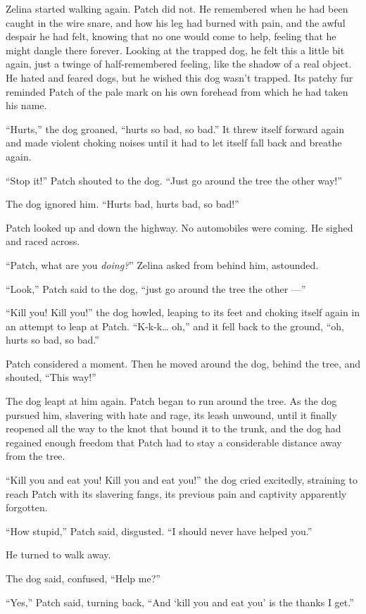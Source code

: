 \documentclass[ebook,oneside,openany,12pt]{memoir}
\begin{document}
Zelina started walking again. Patch did not. He remembered when he had
been caught in the wire snare, and how his leg had burned with pain,
and the awful despair he had felt, knowing that no one would come to
help, feeling that he might dangle there forever. Looking at the
trapped dog, he felt this a little bit again, just a twinge of
half-remembered feeling, like the shadow of a real object. He hated
and feared dogs, but he wished this dog wasn’t trapped. Its patchy fur
reminded Patch of the pale mark on his own forehead from which he had
taken his name.

“Hurts,” the dog groaned, “hurts so bad, so bad.” It threw itself
forward again and made violent choking noises until it had to let
itself fall back and breathe again.

“Stop it!” Patch shouted to the dog. “Just go around the tree the
other way!”

The dog ignored him. “Hurts bad, hurts bad, so bad!”

Patch looked up and down the highway. No automobiles were coming. He
sighed and raced across.

“Patch, what are you \emph{doing?}” Zelina asked from behind him,
astounded.

“Look,” Patch said to the dog, “just go around the tree the other —”

“Kill you! Kill you!” the dog howled, leaping to its feet and choking
itself again in an attempt to leap at Patch. “K-k-k… oh,” and it fell
back to the ground, “oh, hurts so bad, so bad.”

Patch considered a moment. Then he moved around the dog, behind the
tree, and shouted, “This way!”

The dog leapt at him again. Patch began to run around the tree. As the
dog pursued him, slavering with hate and rage, its leash unwound,
until it finally reopened all the way to the knot that bound it to the
trunk, and the dog had regained enough freedom that Patch had to stay
a considerable distance away from the tree.

“Kill you and eat you! Kill you and eat you!” the dog cried excitedly,
straining to reach Patch with its slavering fangs, its previous pain
and captivity apparently forgotten.

“How stupid,” Patch said, disgusted. “I should never have helped you.”

He turned to walk away.

The dog said, confused, “Help me?”

“Yes,” Patch said, turning back, “And ‘kill you and eat you’ is the
thanks I get.”
\end{document}

